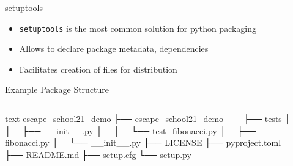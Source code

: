 \documentclass[
  aspectratio=1610,
]{beamer}
\begin{document}
\begin{frame}[c]{setuptools}
  \begin{itemize}
    \item \texttt{setuptools} is the most common solution for python packaging
    \item Allows to declare package metadata, dependencies
    \item Facilitates creation of files for distribution
  \end{itemize}
\end{frame}
\begin{frame}[c, fragile]{Example Package Structure}
  \begin{columns}[onlytextwidth, c]%
    \begin{column}{0.44\textwidth}%
      \begin{code}{text}
        escape_school21_demo
        ├── escape_school21_demo
        │   ├── tests
        │   │   ├── __init__.py
        │   │   └── test_fibonacci.py
        │   ├── fibonacci.py
        │   └── __init__.py
        ├── LICENSE
        ├── pyproject.toml
        ├── README.md
        ├── setup.cfg
        └── setup.py
      \end{code}
    \end{column}%
    \hfill%
    \begin{column}{0.55\textwidth}%
    \end{column}%
  \end{columns}%
\end{frame}
\end{document}
